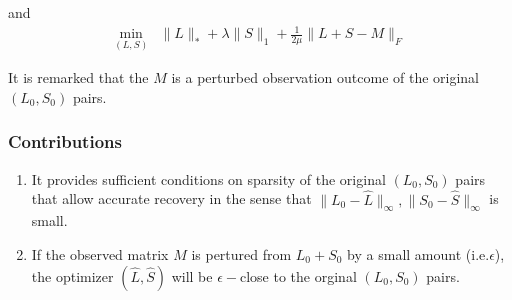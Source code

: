 and
\begin{eqnarray}
\min_{(L,S)} & \|L\|_{*}+\lambda\|S\|_{1}+\frac{1}{2\mu}\|L+S-M\|_{F}
\end{eqnarray}


It is remarked that the $M$ is a perturbed observation outcome of the original $(L_{0},S_{0})$ pairs.


\subsubsection{Contributions}
\begin{enumerate}
\item It provides sufficient conditions on sparsity of the original $(L_{0},S_{0})$ pairs that allow accurate recovery in the sense that $\|L_{0}-\hat{L}\|_{\infty},\|S_{0}-\hat{S}\|_{\infty}$ is small.
\item If the observed matrix $M$ is pertured from $L_{0}+S_{0}$ by a small amount (i.e.$\epsilon$), the optimizer $(\hat{L}, \hat{S})$ will be $\epsilon-$close to the orginal $(L_{0},S_{0})$ pairs.
\end{enumerate}
